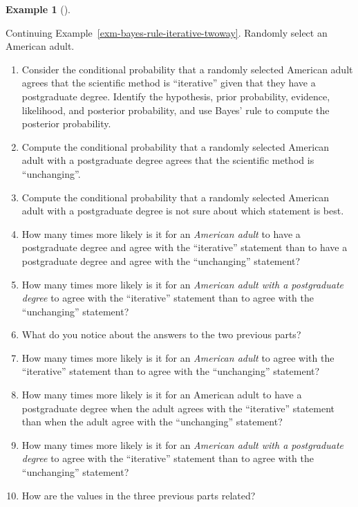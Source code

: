 \documentclass[
  letterpaper,
  DIV=11,
  numbers=noendperiod]{scrreprt}
\providecommand{\tightlist}{%
  \setlength{\itemsep}{0pt}\setlength{\parskip}{0pt}}
\theoremstyle{plain}
\theoremstyle{definition}
\newtheorem{example}{Example}[chapter]
\theoremstyle{definition}
\theoremstyle{definition}
\theoremstyle{remark}
\begin{document}
\begin{tcolorbox}[enhanced jigsaw, opacityback=0, left=2mm, colframe=quarto-callout-note-color-frame, toprule=.15mm, breakable, colback=white, leftrule=.75mm, arc=.35mm, rightrule=.15mm, bottomrule=.15mm]

\begin{example}[]\protect\hypertarget{exm-bayes-rule-iterative-bayestable}{}\label{exm-bayes-rule-iterative-bayestable}

Continuing Example~\ref{exm-bayes-rule-iterative-twoway}. Randomly
select an American adult.

\begin{enumerate}
\def\labelenumi{\arabic{enumi}.}
\tightlist
\item
  Consider the conditional probability that a randomly selected American
  adult agrees that the scientific method is ``iterative'' given that
  they have a postgraduate degree. Identify the hypothesis, prior
  probability, evidence, likelihood, and posterior probability, and use
  Bayes' rule to compute the posterior probability.
\item
  Compute the conditional probability that a randomly selected American
  adult with a postgraduate degree agrees that the scientific method is
  ``unchanging''.
\item
  Compute the conditional probability that a randomly selected American
  adult with a postgraduate degree is not sure about which statement is
  best.
\item
  How many times more likely is it for an \emph{American adult} to have
  a postgraduate degree and agree with the ``iterative'' statement than
  to have a postgraduate degree and agree with the ``unchanging''
  statement?
\item
  How many times more likely is it for an \emph{American adult with a
  postgraduate degree} to agree with the ``iterative'' statement than to
  agree with the ``unchanging'' statement?
\item
  What do you notice about the answers to the two previous parts?
\item
  How many times more likely is it for an \emph{American adult} to agree
  with the ``iterative'' statement than to agree with the ``unchanging''
  statement?
\item
  How many times more likely is it for an American adult to have a
  postgraduate degree when the adult agrees with the ``iterative''
  statement than when the adult agree with the ``unchanging'' statement?
\item
  How many times more likely is it for an \emph{American adult with a
  postgraduate degree} to agree with the ``iterative'' statement than to
  agree with the ``unchanging'' statement?
\item
  How are the values in the three previous parts related?
\end{enumerate}

\end{example}

\end{tcolorbox}
\end{document}
